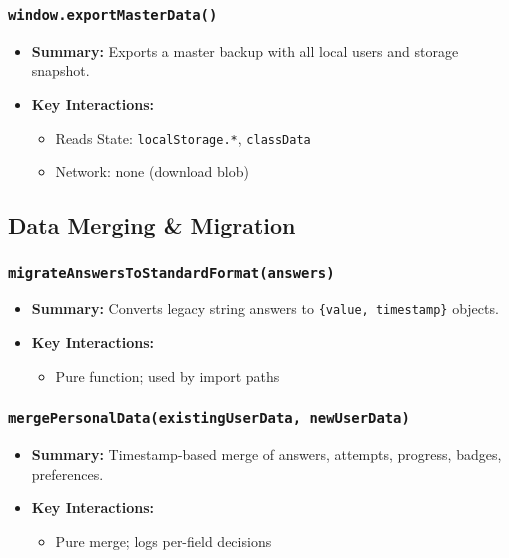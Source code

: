 \documentclass[11pt,letterpaper]{article}
\begin{document}
\subsubsection{\texttt{window.exportMasterData()}}
\begin{itemize}
    \item \textbf{Summary:} Exports a master backup with all local users and storage snapshot.
    \item \textbf{Key Interactions:}
    \begin{itemize}
        \item Reads State: \texttt{localStorage.*}, \texttt{classData}
        \item Network: none (download blob)
    \end{itemize}
\end{itemize}

\subsection{Data Merging \& Migration}

\subsubsection{\texttt{migrateAnswersToStandardFormat(answers)}}
\begin{itemize}
    \item \textbf{Summary:} Converts legacy string answers to \texttt{\{value, timestamp\}} objects.
    \item \textbf{Key Interactions:}
    \begin{itemize}
        \item Pure function; used by import paths
    \end{itemize}
\end{itemize}

\subsubsection{\texttt{mergePersonalData(existingUserData, newUserData)}}
\begin{itemize}
    \item \textbf{Summary:} Timestamp-based merge of answers, attempts, progress, badges, preferences.
    \item \textbf{Key Interactions:}
    \begin{itemize}
        \item Pure merge; logs per-field decisions
    \end{itemize}
\end{itemize}
\end{document}
